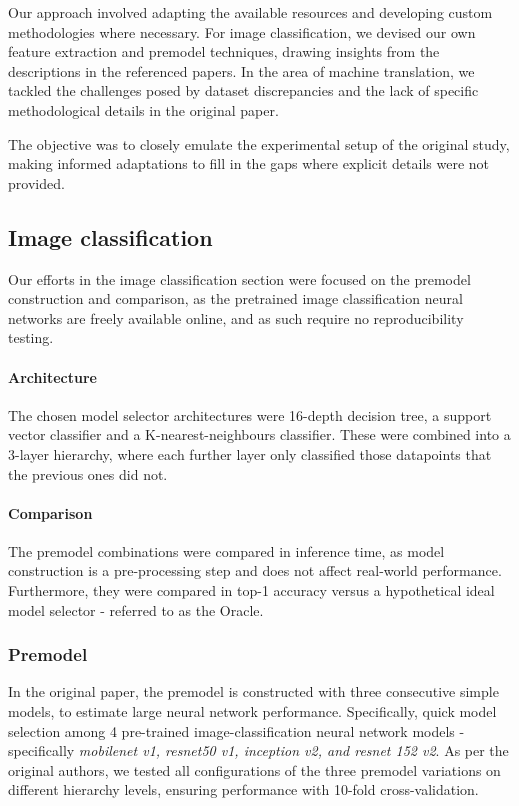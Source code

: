 Our approach involved adapting the available resources and developing custom methodologies where necessary. For image classification, we devised our own feature extraction and premodel techniques, drawing insights from the descriptions in the referenced papers. In the area of machine translation, we tackled the challenges posed by dataset discrepancies and the lack of specific methodological details in the original paper.

The objective was to closely emulate the experimental setup of the original study, making informed adaptations to fill in the gaps where explicit details were not provided.

\subsection{Image classification}

Our efforts in the image classification section were focused on the premodel construction and comparison, as the pretrained image classification neural networks are freely available online, and as such require no reproducibility testing.
\paragraph{Architecture}
The chosen model selector architectures were 16-depth decision tree, a support vector classifier and a K-nearest-neighbours classifier. These were combined into a 3-layer hierarchy, where each further layer only classified those datapoints that the previous ones did not.
\paragraph{Comparison}
The premodel combinations were compared in inference time, as model construction is a pre-processing step and does not affect real-world performance. Furthermore, they were compared in top-1 accuracy versus a hypothetical ideal model selector - referred to as the Oracle.


\subsubsection{Premodel}
In the original paper, the premodel is constructed with three consecutive simple models, to estimate large neural network performance. Specifically, quick model selection among 4 pre-trained image-classification neural network models - specifically \textit{mobilenet v1, resnet50 v1, inception v2, and resnet 152 v2}. As per the original authors, we tested all configurations of the three premodel variations on different hierarchy levels, ensuring performance with 10-fold cross-validation.

